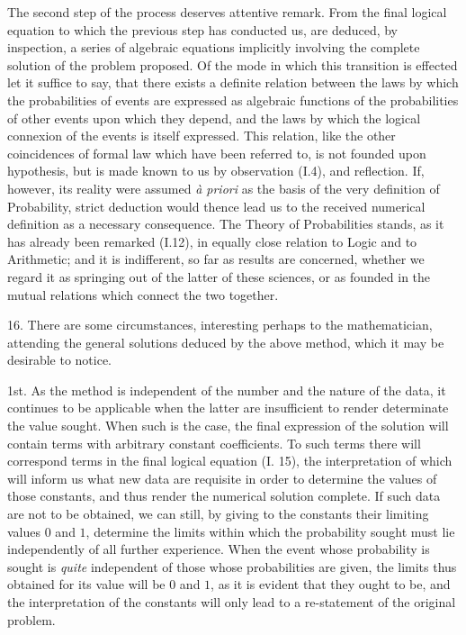\documentclass[oneside]{book}
\begin{document}
The second step of the process deserves attentive remark.
From the final logical equation to which the previous step has
conducted us, are deduced, by inspection, a series of algebraic
equations implicitly involving the complete solution of the problem
proposed. Of the mode in which this transition is effected
let it suffice to say, that there exists a definite relation between
the laws by which the probabilities of events are expressed as
algebraic functions of the probabilities of other events upon which
they depend, and the laws by which the logical connexion of
the events is itself expressed. This relation, like the other coincidences
of formal law which have been referred to, is not
founded upon hypothesis, but is made known to us by observation
(I.4), and reflection. If, however, its reality were assumed \textit{\`{a} priori}
as the basis of the very definition of Probability, strict deduction
would thence lead us to the received numerical definition as a
necessary consequence. The Theory of Probabilities stands, as
it has already been remarked (I.12), in equally close relation to
Logic and to Arithmetic; and it is indifferent, so far as results
are concerned, whether we regard it as springing out of the latter
of these sciences, or as founded in the mutual relations which
connect the two together.

16. There are some circumstances, interesting perhaps to the
mathematician, attending the general solutions deduced by the
above method, which it may be desirable to notice.

1st. As the method is independent of the number and the
nature of the data, it continues to be applicable when the latter
are insufficient to render determinate the value sought. When
such is the case, the final expression of the solution will contain
terms with arbitrary constant coefficients. To such terms there
will correspond terms in the final logical equation (I. 15), the
interpretation of which will inform us what new data are requisite
in order to determine the values of those constants, and
thus render the numerical solution complete. If such data are
not to be obtained, we can still, by giving to the constants their
limiting values $0$ and $1$, determine the limits within which the
probability sought must lie independently of all further experience.
When the event whose probability is sought is \textit{quite} independent
of those whose probabilities are given, the limits thus
obtained for its value will be $0$ and $1$, as it is evident that they
ought to be, and the interpretation of the constants will only
lead to a re-statement of the original problem.
\end{document}
